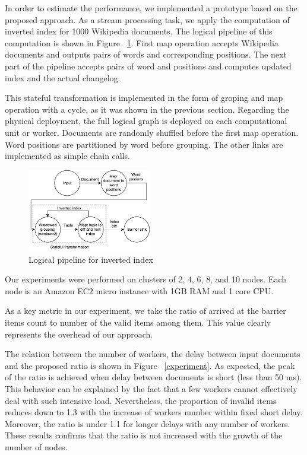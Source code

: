 
\label {fs-experiments}

In order to estimate the performance, we implemented a prototype based on the proposed approach. As a stream processing task, we apply the computation of inverted index for 1000 Wikipedia documents. The logical pipeline of this computation is shown in Figure ~\ref{inverted-index}. First map operation accepts Wikipedia documents and outputs pairs of words and corresponding positions. The next part of the pipeline accepts pairs of word and positions and computes updated index and the actual changelog. 

This stateful transformation is implemented in the form of groping and map operation with a cycle, as it was shown in the previous section. Regarding the physical deployment, the full logical graph is deployed on each computational unit or worker. Documents are randomly shuffled before the first map operation. Word positions are partitioned by word before grouping. The other links are implemented as simple chain calls.

\begin{figure}[htbp]
  \centering
  \includegraphics[width=0.48\textwidth]{pics/inverted-index}
  \caption{Logical pipeline for inverted index}
  \label {inverted-index}
\end{figure}

Our experiments were performed on clusters of 2, 4, 6, 8, and 10 nodes. Each node is an Amazon EC2 micro instance with 1GB RAM and 1 core CPU.

As a key metric in our experiment, we take the ratio of arrived at the barrier items count to number of the valid items among them. This value clearly represents the overhead of our approach. 

The relation between the number of workers, the delay between input documents and the proposed ratio is shown in Figure ~\ref{experiment}. As expected, the peak of the ratio is achieved when delay between documents is short (less than 50 ms). This behavior can be explained by the fact that a few workers cannot effectively deal with such intensive load. Nevertheless, the proportion of invalid items reduces down to 1.3 with the increase of workers number within fixed short delay. Moreover, the ratio is under 1.1 for longer delays with any number of workers. These results confirms that the ratio is not increased with the growth of the number of nodes.

